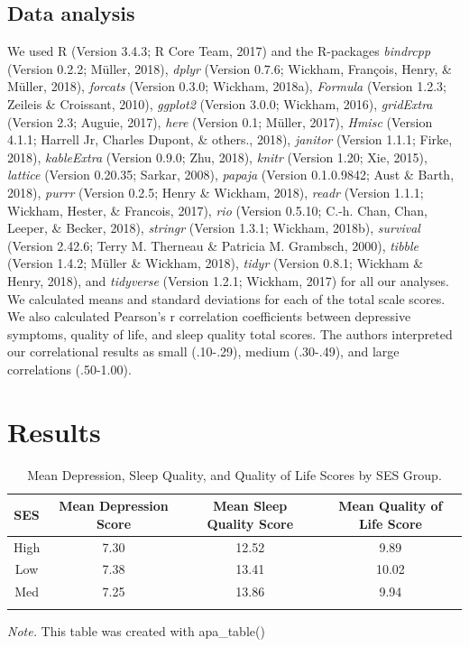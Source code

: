 \documentclass[man]{apa6}
\begin{document}
\subsection{Data analysis}\label{data-analysis}

We used R (Version 3.4.3; R Core Team, 2017) and the R-packages
\emph{bindrcpp} (Version 0.2.2; Müller, 2018), \emph{dplyr} (Version
0.7.6; Wickham, François, Henry, \& Müller, 2018), \emph{forcats}
(Version 0.3.0; Wickham, 2018a), \emph{Formula} (Version 1.2.3; Zeileis
\& Croissant, 2010), \emph{ggplot2} (Version 3.0.0; Wickham, 2016),
\emph{gridExtra} (Version 2.3; Auguie, 2017), \emph{here} (Version 0.1;
Müller, 2017), \emph{Hmisc} (Version 4.1.1; Harrell Jr, Charles Dupont,
\& others., 2018), \emph{janitor} (Version 1.1.1; Firke, 2018),
\emph{kableExtra} (Version 0.9.0; Zhu, 2018), \emph{knitr} (Version
1.20; Xie, 2015), \emph{lattice} (Version 0.20.35; Sarkar, 2008),
\emph{papaja} (Version 0.1.0.9842; Aust \& Barth, 2018), \emph{purrr}
(Version 0.2.5; Henry \& Wickham, 2018), \emph{readr} (Version 1.1.1;
Wickham, Hester, \& Francois, 2017), \emph{rio} (Version 0.5.10; C.-h.
Chan, Chan, Leeper, \& Becker, 2018), \emph{stringr} (Version 1.3.1;
Wickham, 2018b), \emph{survival} (Version 2.42.6; Terry M. Therneau \&
Patricia M. Grambsch, 2000), \emph{tibble} (Version 1.4.2; Müller \&
Wickham, 2018), \emph{tidyr} (Version 0.8.1; Wickham \& Henry, 2018),
and \emph{tidyverse} (Version 1.2.1; Wickham, 2017) for all our
analyses. We calculated means and standard deviations for each of the
total scale scores. We also calculated Pearson's r correlation
coefficients between depressive symptoms, quality of life, and sleep
quality total scores. The authors interpreted our correlational results
as small (.10-.29), medium (.30-.49), and large correlations (.50-1.00).

\section{Results}\label{results}

\begin{table}[tbp]
\begin{center}
\begin{threeparttable}
\caption{\label{tab:Table 1}Mean Depression, Sleep Quality, and Quality of Life Scores by SES Group.}
\begin{tabular}{cccc}
\toprule
SES & \multicolumn{1}{c}{Mean Depression Score} & \multicolumn{1}{c}{Mean Sleep Quality Score} & \multicolumn{1}{c}{Mean Quality of Life Score}\\
\midrule
High & 7.30 & 12.52 & 9.89\\
Low & 7.38 & 13.41 & 10.02\\
Med & 7.25 & 13.86 & 9.94\\
\bottomrule
\addlinespace
\end{tabular}
\begin{tablenotes}[para]
\normalsize{\textit{Note.} This table was created with apa\_table()}
\end{tablenotes}
\end{threeparttable}
\end{center}
\end{table}
\end{document}

